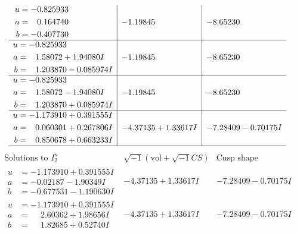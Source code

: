 \documentclass[1p]{elsarticle_modified}
\theoremstyle{definition}
\newcommand{\I}{\sqrt{-1}}
\begin{document}
$$\begin{array}{c|c|c}
\begin{aligned}
u &= -0.825933\phantom{ +0.000000I} \\
a &= \phantom{-}0.164740\phantom{ +0.000000I} \\
b &= -0.407730\phantom{ +0.000000I}\end{aligned}
 & -1.19845\phantom{ +0.000000I} & -8.65230\phantom{ +0.000000I} \\ \hline\begin{aligned}
u &= -0.825933\phantom{ +0.000000I} \\
a &= \phantom{-}1.58072 + 1.94080 I \\
b &= \phantom{-}1.203870 - 0.085974 I\end{aligned}
 & -1.19845\phantom{ +0.000000I} & -8.65230\phantom{ +0.000000I} \\ \hline\begin{aligned}
u &= -0.825933\phantom{ +0.000000I} \\
a &= \phantom{-}1.58072 - 1.94080 I \\
b &= \phantom{-}1.203870 + 0.085974 I\end{aligned}
 & -1.19845\phantom{ +0.000000I} & -8.65230\phantom{ +0.000000I} \\ \hline\begin{aligned}
u &= -1.173910 + 0.391555 I \\
a &= \phantom{-}0.060301 + 0.267806 I \\
b &= \phantom{-}0.850678 + 0.663233 I\end{aligned}
 & -4.37135 + 1.33617 I & -7.28409 - 0.70175 I\\
 \hline 
 \end{array}$$\newpage$$\begin{array}{c|c|c}  
\text{Solutions to }I^u_{2}& \I (\text{vol} + \sqrt{-1}CS) & \text{Cusp shape}\\
 \hline 
\begin{aligned}
u &= -1.173910 + 0.391555 I \\
a &= -0.02187 - 1.90349 I \\
b &= -0.677531 - 1.190630 I\end{aligned}
 & -4.37135 + 1.33617 I & -7.28409 - 0.70175 I \\ \hline\begin{aligned}
u &= -1.173910 + 0.391555 I \\
a &= \phantom{-}2.60362 + 1.98656 I \\
b &= \phantom{-}1.82685 + 0.52740 I\end{aligned}
 & -4.37135 + 1.33617 I & -7.28409 - 0.70175 I \\ \hline\begin{aligned}

\end{aligned}
\end{array}$$
\end{document}
